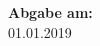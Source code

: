 \begin{center}




\vspace{1.4cm}

\hspace*{-1.0cm} \textbf{Abgabe am:} \\
\hspace*{-1.0cm} 01.01.2019 \\

\end{center}










